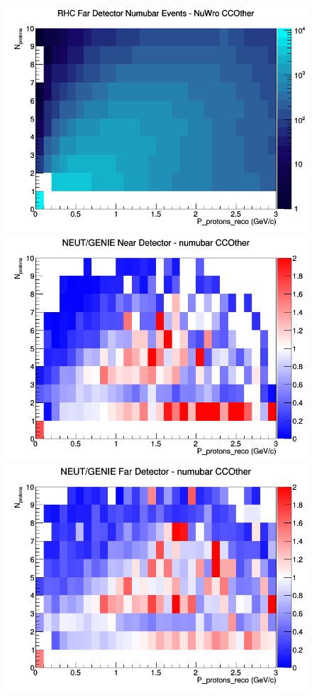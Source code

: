 \begin{figure}[h]
\endminipage
{}
\includegraphics[width=\linewidth]{eff_N_P/GAr/protons/CCOther_RHC_FD_numubar_N_P_NuWro.png}
\endminipage
\newline
{}
\includegraphics[width=\linewidth]{eff_N_P/GAr/protons/ratios/CCOther_NEUT_GENIE_numubar_near_N_P.png}
\endminipage
{}
\includegraphics[width=\linewidth]{eff_N_P/GAr/protons/ratios/CCOther_NEUT_GENIE_numubar_far_N_P.png}

\end{figure}
